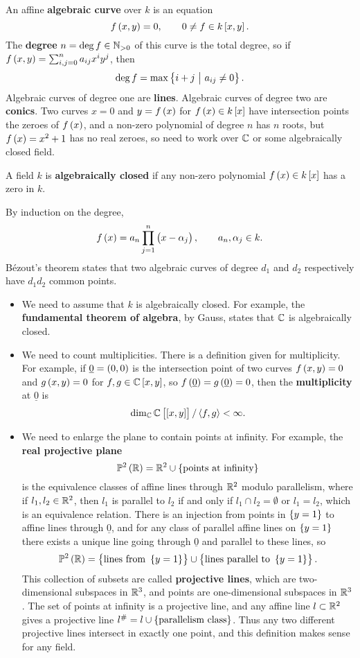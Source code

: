 An affine \textbf{algebraic curve} over $ k $ is an equation
$$ f\br{x, y} = 0, \qquad 0 \ne f \in k\sbr{x, y}. $$
The \textbf{degree} $ n = \deg f \in \mathbb{N}_{> 0} $ of this curve is the total degree, so if $ f\br{x, y} = \sum_{i, j = 0}^n a_{ij}x^iy^j $, then
$$ \deg f = \max\cbr{i + j \st a_{ij} \ne 0}. $$
Algebraic curves of degree one are \textbf{lines}. Algebraic curves of degree two are \textbf{conics}. Two curves $ x = 0 $ and $ y = f\br{x} $ for $ f\br{x} \in k\sbr{x} $ have intersection points the zeroes of $ f\br{x} $, and a non-zero polynomial of degree $ n $ has $ n $ roots, but $ f\br{x} = x^2 + 1 $ has no real zeroes, so need to work over $ \mathbb{C} $ or some algebraically closed field.

\begin{definition}
A field $ k $ is \textbf{algebraically closed} if any non-zero polynomial $ f\br{x} \in k\sbr{x} $ has a zero in $ k $.
\end{definition}

By induction on the degree,
$$ f\br{x} = a_n\prod_{j = 1}^n \br{x - \alpha_j}, \qquad a_n, \alpha_j \in k. $$
B\'ezout's theorem states that two algebraic curves of degree $ d_1 $ and $ d_2 $ respectively have $ d_1d_2 $ common points.
\begin{itemize}
\item We need to assume that $ k $ is algebraically closed. For example, the \textbf{fundamental theorem of algebra}, by Gauss, states that $ \mathbb{C} $ is algebraically closed.
\item We need to count multiplicities. There is a definition given for multiplicity. For example, if $ \underline{0} = \br{0, 0} $ is the intersection point of two curves $ f\br{x, y} = 0 $ and $ g\br{x, y} = 0 $ for $ f, g \in \CC\sbr{x, y} $, so $ f\br{\underline{0}} = g\br{\underline{0}} = 0 $, then the \textbf{multiplicity} at $ \underline{0} $ is
$$ \dim_\CC \CC\sbr{\sbr{x, y}} / \abr{f, g} < \infty. $$
\item We need to enlarge the plane to contain points at infinity. For example, the \textbf{real projective plane}
$$ \PP^2\br{\RR} = \RR^2 \cup \cbr{\text{points at infinity}} $$
is the equivalence classes of affine lines through $ \mathbb{R}^2 $ modulo parallelism, where if $ l_1, l_2 \in \mathbb{R}^2 $, then $ l_1 $ is parallel to $ l_2 $ if and only if $ l_1 \cap l_2 = \emptyset $ or $ l_1 = l_2 $, which is an equivalence relation. There is an injection from points in $ \cbr{y = 1} $ to affine lines through $ \underline{0} $, and for any class of parallel affine lines on $ \cbr{y = 1} $ there exists a unique line going through $ \underline{0} $ and parallel to these lines, so
$$ \PP^2\br{\RR} = \cbr{\text{lines from} \ \cbr{y = 1}} \cup \cbr{\text{lines parallel to} \ \cbr{y = 1}}. $$
This collection of subsets are called \textbf{projective lines}, which are two-dimensional subspaces in $ \mathbb{R}^3 $, and points are one-dimensional subspaces in $ \mathbb{R}^3 $. The set of points at infinity is a projective line, and any affine line $ l \subset \mathbb{R}^2 $ gives a projective line $ l^\# = l \cup \cbr{\text{parallelism class}} $. Thus any two different projective lines intersect in exactly one point, and this definition makes sense for any field.
\end{itemize}

